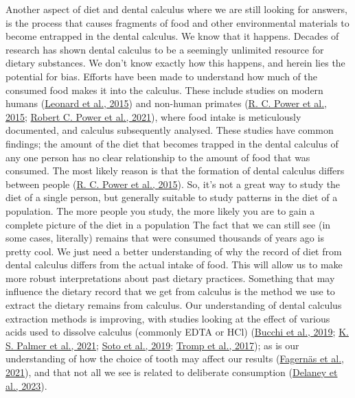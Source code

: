 \documentclass[
  letterpaper,
]{book}
\begin{document}
Another aspect of diet and dental calculus where we are still looking
for answers, is the process that causes fragments of food and other
environmental materials to become entrapped in the dental calculus. We
know that it happens. Decades of research has shown dental calculus to
be a seemingly unlimited resource for dietary substances. We don't know
exactly how this happens, and herein lies the potential for bias.
Efforts have been made to understand how much of the consumed food makes
it into the calculus. These include studies on modern humans
(\protect\hyperlink{ref-leonardPlantMicroremains2015}{Leonard et al.,
2015}) and non-human primates
(\protect\hyperlink{ref-powerChimpCalculus2015}{R. C. Power et al.,
2015}; \protect\hyperlink{ref-powerRepresentativenessDental2021}{Robert
C. Power et al., 2021}), where food intake is meticulously documented,
and calculus subsequently analysed. These studies have common findings;
the amount of the diet that becomes trapped in the dental calculus of
any one person has no clear relationship to the amount of food that was
consumed. The most likely reason is that the formation of dental
calculus differs between people
(\protect\hyperlink{ref-powerChimpCalculus2015}{R. C. Power et al.,
2015}). So, it's not a great way to study the diet of a single person,
but generally suitable to study patterns in the diet of a population.
The more people you study, the more likely you are to gain a complete
picture of the diet in a population The fact that we can still see (in
some cases, literally) remains that were consumed thousands of years ago
is pretty cool. We just need a better understanding of why the record of
diet from dental calculus differs from the actual intake of food. This
will allow us to make more robust interpretations about past dietary
practices. Something that may influence the dietary record that we get
from calculus is the method we use to extract the dietary remains from
calculus. Our understanding of dental calculus extraction methods is
improving, with studies looking at the effect of various acids used to
dissolve calculus (commonly EDTA or HCl)
(\protect\hyperlink{ref-bucchiComparisonsMethods2019}{Bucchi et al.,
2019}; \protect\hyperlink{ref-palmerComparingUse2021}{K. S. Palmer et
al., 2021};
\protect\hyperlink{ref-sotoCharacterizationDecontamination2019}{Soto et
al., 2019}; \protect\hyperlink{ref-trompEDTACalculus2017}{Tromp et al.,
2017}); as is our understanding of how the choice of tooth may affect
our results
(\protect\hyperlink{ref-fagernasMicrobialBiogeography2021}{Fagernäs et
al., 2021}), and that not all we see is related to deliberate
consumption (\protect\hyperlink{ref-delaneyMoreWhat2023}{Delaney et al.,
2023}).
\end{document}
